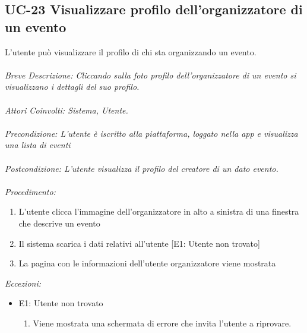 \subsection{UC-23 Visualizzare profilo dell'organizzatore di un evento}
L'utente può visualizzare il profilo di chi sta organizzando un evento.
\\
\\
\textit{Breve Descrizione: Cliccando sulla foto profilo dell'organizzatore di un evento si visualizzano i dettagli del suo profilo.} 
\\
\\
\textit{Attori Coinvolti: Sistema, Utente.}
\\
\\
\textit{Precondizione: L'utente è iscritto alla piattaforma, loggato nella app e visualizza una lista di eventi}
\\
\\
\textit{Postcondizione: L'utente visualizza il profilo del creatore di un dato evento.}
\\
\\
\textit{Procedimento:}
\begin{enumerate}
	\item L'utente clicca l'immagine dell'organizzatore in alto a sinistra di una finestra che descrive un evento
	\item Il sistema scarica i dati relativi all'utente [E1: Utente non trovato]
	\item La pagina con le informazioni dell'utente organizzatore viene mostrata
\end{enumerate}


\textit{Eccezioni:}
\begin{itemize}
	\item E1: Utente non trovato
	\begin{enumerate}
		\item Viene mostrata una schermata di errore che invita l'utente a riprovare.
	\end{enumerate}
\end{itemize}